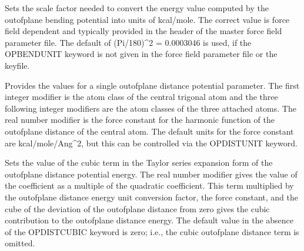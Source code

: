 \documentclass[letterpaper,11pt,english]{sphinxmanual}
\begin{document}
\ignorespaces {}\label{\detokenize{text/keywords:key-opbendunit}}\begin{description}
\sphinxAtStartPar
Sets the scale factor needed to convert the energy value computed by the out\sphinxhyphen{}of\sphinxhyphen{}plane bending potential into units of kcal/mole. The correct value is force field dependent and typically provided in the header of the master force field parameter file. The default of (Pi/180)\textasciicircum{}2 = 0.0003046 is used, if the OPBENDUNIT keyword is not given in the force field parameter file or the keyfile.

\end{description}

\ignorespaces {}\label{\detokenize{text/keywords:key-opdist}}\begin{description}
\sphinxAtStartPar
Provides the values for a single out\sphinxhyphen{}of\sphinxhyphen{}plane distance potential parameter. The first integer modifier is the atom class of the central trigonal atom and the three following integer modifiers are the atom classes of the three attached atoms. The real number modifier is the force constant for the harmonic function of the out\sphinxhyphen{}of\sphinxhyphen{}plane distance of the central atom. The default units for the force constant are kcal/mole/Ang\textasciicircum{}2, but this can be controlled via the OPDISTUNIT keyword.

\end{description}

\ignorespaces {}\label{\detokenize{text/keywords:key-opdist-cubic}}\begin{description}
\sphinxAtStartPar
Sets the value of the cubic term in the Taylor series expansion form of the out\sphinxhyphen{}of\sphinxhyphen{}plane distance potential energy. The real number modifier gives the value of the coefficient as a multiple of the quadratic coefficient. This term multiplied by the out\sphinxhyphen{}of\sphinxhyphen{}plane distance energy unit conversion factor, the force constant, and the cube of the deviation of the out\sphinxhyphen{}of\sphinxhyphen{}plane distance from zero gives the cubic contribution to the out\sphinxhyphen{}of\sphinxhyphen{}plane distance energy. The default value in the absence of the OPDIST\sphinxhyphen{}CUBIC keyword is zero; i.e., the cubic out\sphinxhyphen{}of\sphinxhyphen{}plane distance term is omitted.

\end{description}
\end{document}
